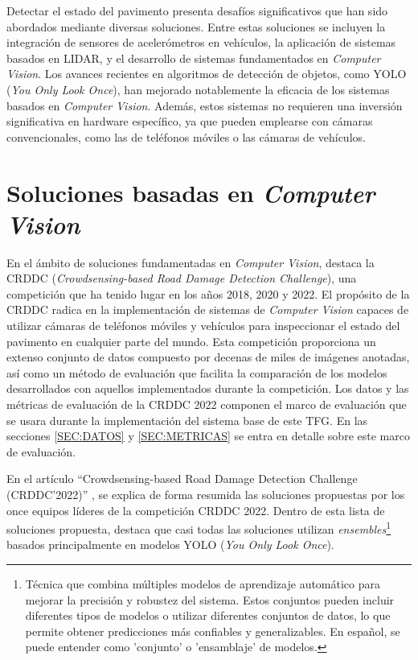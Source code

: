 
Detectar el estado del pavimento presenta desafíos significativos que han sido abordados mediante diversas soluciones. Entre estas soluciones se incluyen la integración de sensores de acelerómetros en vehículos\cite{Pavement_Anomalies_Accelerometer}, la aplicación de sistemas basados en LIDAR\cite{LIDAR_Blasiis}\cite{LIDAR_VanDerHorst}, y el desarrollo de sistemas fundamentados en \textit{Computer Vision}. Los avances recientes en algoritmos de detección de objetos, como YOLO (\textit{You Only Look Once}), han mejorado notablemente la eficacia de los sistemas basados en \textit{Computer Vision}. Además, estos sistemas no requieren una inversión significativa en hardware específico, ya que pueden emplearse con cámaras convencionales, como las de teléfonos móviles o las cámaras de vehículos.

\section{Soluciones basadas en \textit{Computer Vision}}
En el ámbito de soluciones fundamentadas en \textit{Computer Vision}, destaca la CRDDC (\textit{Crowdsensing-based Road Damage Detection Challenge}), una competición que ha tenido lugar en los años 2018, 2020 y 2022. El propósito de la CRDDC radica en la implementación de sistemas de \textit{Computer Vision} capaces de utilizar cámaras de teléfonos móviles y vehículos para inspeccionar el estado del pavimento en cualquier parte del mundo. Esta competición proporciona un extenso conjunto de datos compuesto por decenas de miles de imágenes anotadas, así como un método de evaluación que facilita la comparación de los modelos desarrollados con aquellos implementados durante la competición. Los datos y las métricas de evaluación de la CRDDC 2022 componen el marco de evaluación que se usara durante la implementación del sistema base de este TFG. En las secciones \ref{SEC:DATOS} y \ref{SEC:METRICAS} se entra en detalle sobre este marco de evaluación.

En el artículo “Crowdsensing-based Road Damage Detection Challenge (CRDDC’2022)” \cite{CRDDC2022_paper}, se explica de forma resumida las soluciones propuestas por los once equipos líderes de la competición CRDDC 2022. Dentro de esta lista de soluciones propuesta, destaca que casi todas las soluciones utilizan \textit{ensembles}\footnote{Técnica que combina múltiples modelos de aprendizaje automático para mejorar la precisión y robustez del sistema. Estos conjuntos pueden incluir diferentes tipos de modelos o utilizar diferentes conjuntos de datos, lo que permite obtener predicciones más confiables y generalizables. En español, se puede entender como 'conjunto' o 'ensamblaje' de modelos.} basados principalmente en modelos YOLO (\textit{You Only Look Once}). 

